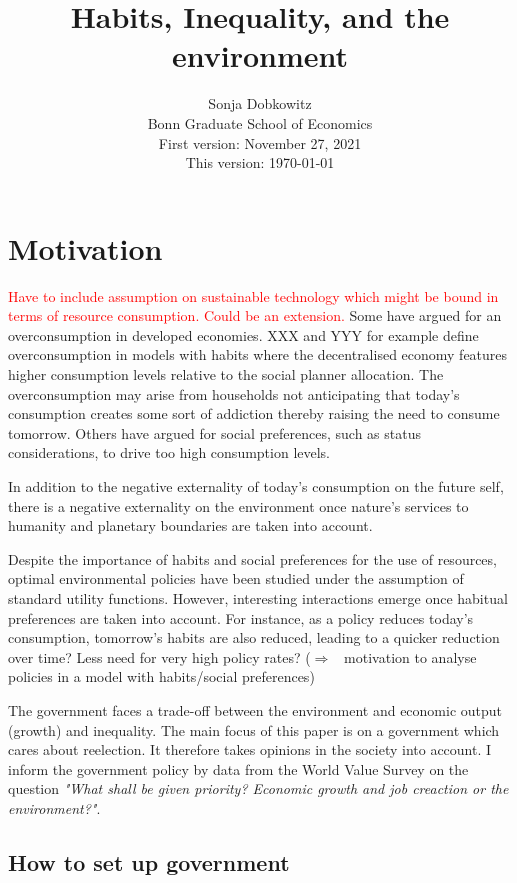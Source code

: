 \documentclass[12pt]{article}
\title{Habits, Inequality, and the environment}
\date{Sonja Dobkowitz\\ Bonn Graduate School of Economics\\ %
\vspace{1mm}
First version: November 27, 2021\\
This version: \today }
\newcommand{\ar}{$\Rightarrow$ \ }
\newcommand{\tr}[1]{\textcolor{red}{#1}}
\begin{document}
%	
	\maketitle
	
\section{Motivation}
\tr{Have to include assumption on sustainable technology which might be bound in terms of resource consumption. Could be an extension. }
Some have argued for an overconsumption in developed economies. XXX and YYY for example define overconsumption in models with habits where the decentralised economy features higher consumption levels relative to the social planner allocation. The overconsumption may arise from households not anticipating that today's consumption creates some sort of addiction thereby raising the need to consume tomorrow. Others have argued for social preferences, such as status considerations, to drive too high consumption levels.  

In addition to the negative externality of today's consumption on the future self, there is a negative externality on the environment once nature's services to humanity and planetary boundaries are taken into account. 

Despite the importance of habits and social preferences for the use of resources, optimal environmental policies have been studied under the assumption of standard utility functions. However, interesting interactions emerge once habitual preferences are taken into account. 
For instance, as a policy reduces today's consumption, tomorrow's habits are also reduced, leading to a quicker reduction over time? Less need for very high policy rates? 
(\ar motivation to analyse policies in a model with habits/social preferences)

The government faces a trade-off between the environment and economic output (growth) and inequality. The main focus of this paper is on a government which cares about reelection. It therefore takes opinions in the society into account. I inform the government policy by data from the World Value Survey on the question \textit{"What shall be given priority? Economic growth and job creaction or the environment?"}. 

\subsection{How to set up government}
\end{document}
